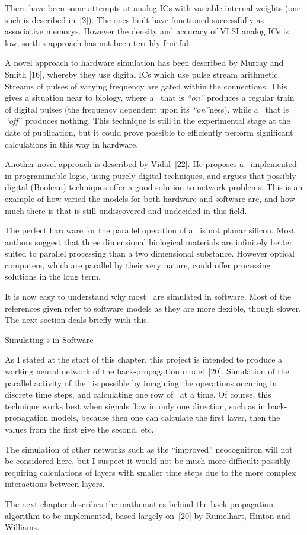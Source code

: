 There have been some attempts at analog ICs with variable internal
weights (one such is described in~[2]).
The ones built have functioned successfully as associative memorys.
However the density and accuracy of VLSI analog ICs is low, so
this approach has not been terribly fruitful.

A novel approach to hardware simulation has been described by Murray and
Smith [16], whereby they use digital ICs which use pulse stream
arithmetic.
Streams of pulses of varying frequency are gated within the connections.
This gives a situation near to biology, where a \neu\ that is {\sl ``on''\/}
produces a regular train of digital pulses (the frequency dependent upon
its {\sl ``on''}ness), while a \neu\ that is {\sl ``off''\/} produces nothing.
This technique is still in the experimental stage at the date of
publication, but it could prove possible to efficiently perform
significant calculations in this way in hardware.

Another novel approach is described by Vidal~[22].
He proposes a \nn\ implemented in programmable logic, using purely
digital techniques, and argues that possibly digital (Boolean)
techniques offer a good solution to network problems.
This is an example of how varied the models for both hardware and
software are, and how much there is that is still undiscovered and
undecided in this field.

The perfect hardware for the parallel operation of a \nn\ is not planar
silicon.
Most authors suggest that three dimensional biological materials are
infinitely better suited to parallel processing than a two dimensional
substance.
However optical computers, which are parallel by their very nature, could
offer processing solutions in the long term.

It is now easy to understand why most \nns\ are simulated in software.
Most of the references given refer to software models as they are more
flexible, though slower.
The next section deals briefly with this.

\sec Simulating \NN s in Software

As I stated at the start of this chapter, this project is intended to
produce a working neural network of the back-propagation model~[20].
Simulation of the parallel activity of the \neus\ is possible by 
imagining the operations
occuring in discrete time steps, and calculating one row of \neus\ at a
time.
Of course, this technique works best when signals flow in only one direction,
such as in back-propagation models, because then one can calculate the
first layer, then the values from the first give the second, etc.

The simulation of other networks such as the ``improved'' neocognitron
will not be considered here, but I suspect it would not be much more
difficult: possibly requiring calculations of layers with smaller time
steps due to the more complex interactions between layers.

The next chapter describes the mathematics behind the back-propagation
algorithm to be implemented, based largely on~[20] by Rumelhart, Hinton
and Williams.
